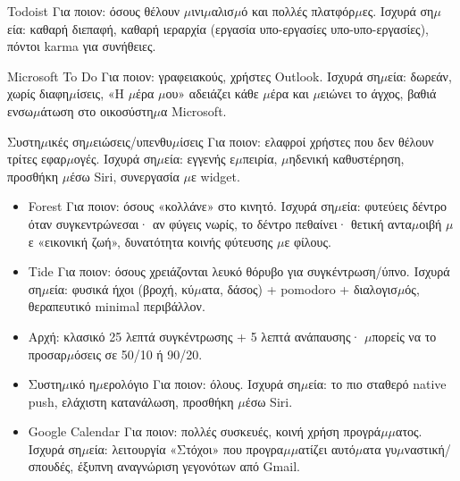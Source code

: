 Todoist Για ποιον: όσους θέλουν $\mu$ινι$\mu$αλισ$\mu$ό και πολλές πλατφόρ$\mu$ες. Ισχυρά ση$\mu$εία: καθαρή διεπαφή, καθαρή ιεραρχία (εργασία υπο-εργασίες υπο-υπο-εργασίες), πόντοι karma για συνήθειες.

Microsoft To Do Για ποιον: γραφειακούς, χρήστες Outlook. Ισχυρά ση$\mu$εία: δωρεάν, χωρίς διαφη$\mu$ίσεις, «Η $\mu$έρα $\mu$ου» αδειάζει κάθε $\mu$έρα και $\mu$ειώνει το άγχος, βαθιά ενσω$\mu$άτωση στο οικοσύστη$\mu$α Microsoft.

Συστη$\mu$ικές ση$\mu$ειώσεις/υπενθυ$\mu$ίσεις Για ποιον: ελαφροί χρήστες που δεν θέλουν τρίτες εφαρ$\mu$ογές. Ισχυρά ση$\mu$εία: εγγενής ε$\mu$πειρία, $\mu$ηδενική καθυστέρηση, προσθήκη $\mu$έσω Siri, συνεργασία $\mu$ε widget.


\begin{itemize}
  \item Forest Για ποιον: όσους «κολλάνε» στο κινητό. Ισχυρά ση$\mu$εία: φυτεύεις δέντρο όταν συγκεντρώνεσαι· αν φύγεις νωρίς, το δέντρο πεθαίνει· θετική αντα$\mu$οιβή $\mu$ε «εικονική ζωή», δυνατότητα κοινής φύτευσης $\mu$ε φίλους.
  \item Tide Για ποιον: όσους χρειάζονται λευκό θόρυβο για συγκέντρωση/ύπνο. Ισχυρά ση$\mu$εία: φυσικά ήχοι (βροχή, κύ$\mu$ατα, δάσος) + pomodoro + διαλογισ$\mu$ός, θεραπευτικό minimal περιβάλλον.
  \item Αρχή: κλασικό 25 λεπτά συγκέντρωσης + 5 λεπτά ανάπαυσης· $\mu$πορείς να το προσαρ$\mu$όσεις σε 50/10 ή 90/20.
\end{itemize}


\begin{itemize}
  \item Συστη$\mu$ικό η$\mu$ερολόγιο Για ποιον: όλους. Ισχυρά ση$\mu$εία: το πιο σταθερό native push, ελάχιστη κατανάλωση, προσθήκη $\mu$έσω Siri.
  \item Google Calendar Για ποιον: πολλές συσκευές, κοινή χρήση προγρά$\mu$$\mu$ατος. Ισχυρά ση$\mu$εία: λειτουργία «Στόχοι» που προγρα$\mu$$\mu$ατίζει αυτό$\mu$ατα γυ$\mu$ναστική/σπουδές, έξυπνη αναγνώριση γεγονότων από Gmail.
\end{itemize}



